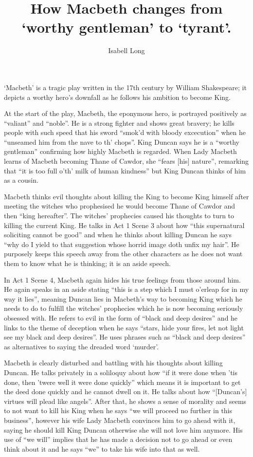 \documentclass{article}
\begin{document}
\title{How Macbeth changes from `worthy gentleman' to `tyrant'.}
\author{Isabell Long}
\maketitle


`Macbeth' is a tragic play written in the 17th century by William Shakespeare; it depicts a worthy hero's downfall as he follows his ambition to become King.

At the start of the play, Macbeth, the eponymous hero, is portrayed positively as ``valiant'' and ``noble''.  He is a strong fighter and shows great bravery; he kills people with such speed that his sword ``smok'd with bloody excecution'' when he ``unseamed him from the nave to th' chops''.  King Duncan says he is a ``worthy gentleman'' confirming how highly Macbeth is regarded.  When Lady Macbeth learns of Macbeth becoming Thane of Cawdor, she ``fears [his] nature'', remarking that ``it is too full o'th' milk of human kindness'' but King Duncan thinks of him as a cousin.

Macbeth thinks evil thoughts about killing the King to become King himself after meeting the witches who prophesised he would become Thane of Cawdor and then ``king hereafter''.  The witches' prophecies caused his thoughts to turn to killing the current King.  He talks in Act 1 Scene 3 about how ``this supernatural soliciting cannot be good'' and when he thinks about killing Duncan he says ``why do I yield to that suggestion whose horrid image doth unfix my hair''.  He purposely keeps this speech away from the other characters as he does not want them to know what he is thinking; it is an aside speech.

In Act 1 Scene 4, Macbeth again hides his true feelings from those around him.  He again speaks in an aside stating ``this is a step which I must o'erleap for in my way it lies'', meaning Duncan lies in Macbeth's way to becoming King which he needs to do to fulfill the witches' prophecies which he is now becoming seriously obsessed with.  He refers to evil in the form of ``black and deep desires'' and he links to the theme of deception when he says ``stars, hide your fires, let not light see my black and deep desires''.  He uses phrases such as ``black and deep desires'' as alternatives to saying the dreaded word `murder'.

Macbeth is clearly disturbed and battling with his thoughts about killing Duncan.  He talks privately in a soliloquy about how ``if it were done when 'tis done, then 'twere well it were done quickly'' which means it is important to get the deed done quickly and he cannot dwell on it.  He talks about how ``[Duncan's] virtues will plead like angels''.  After that, he shows a sense of morality and seems to not want to kill his King when he says ``we will proceed no further in this business'', however his wife Lady Macbeth convinces him to go ahead with it, saying he should kill King Duncan otherwise she will not love him anymore.  His use of ``we will'' implies that he has made a decision not to go ahead or even think about it and he says ``we'' to take his wife into that as well.
\end{document}
